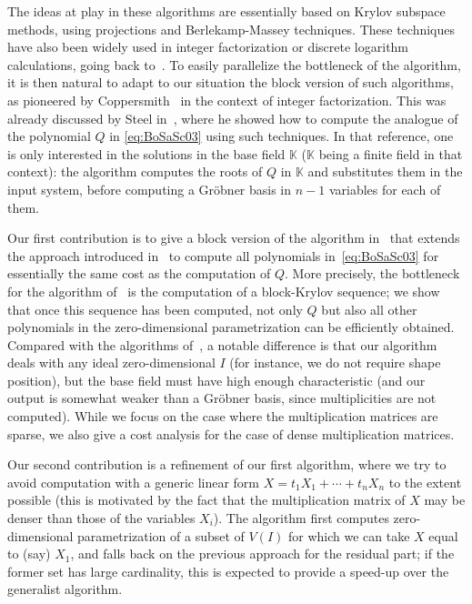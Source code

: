 \documentclass[12pt]{article}
\newcommand{\lf}{X}
\newcommand{\sqfree}{Q}
\def\K{\mathbb{K}}
\def\K {\ensuremath{\mathbb{K}}}
\begin{document}
The ideas at play in these algorithms are essentially based on Krylov
subspace methods, using projections and Berlekamp-Massey techniques.
These techniques have also been widely used in integer factorization
or discrete logarithm calculations, going back to~\cite{LaOd90}.
To easily parallelize the
bottleneck of the algorithm, it is
then natural to adapt to our situation the block version of such
algorithms, as pioneered by Coppersmith~\cite{Coppersmith94}  in the
context of integer factorization. This was already discussed by Steel
in~\cite{Steel15}, where he showed how to compute the analogue of the
polynomial $\sqfree$ in \cref{eq:BoSaSc03} using such techniques. In that reference, one is
only interested in the solutions in the base field $\K$ ($\K$ being a
finite field in that context): the algorithm computes the roots of
$\sqfree$ in $\K$ and substitutes them in the input system, before
computing a Gr\"obner basis in $n-1$ variables for each of them.

Our first contribution is to give a block version of the algorithm
in~\cite{BoSaSc03} that extends the approach introduced
in~\cite{Steel15} to compute all polynomials in~\cref{eq:BoSaSc03} for
essentially the same cost as the computation of $\sqfree$. More
precisely, the bottleneck for the algorithm of~\cite{Steel15} is the
computation of a block-Krylov sequence; we show that once this
sequence has been computed, not only $\sqfree$ but also all other
polynomials in the zero-dimensional parametrization can be efficiently
obtained. Compared with the algorithms of~\cite{FaMo17}, a notable
difference is that our algorithm deals with any ideal zero-dimensional
$I$ (for instance, we do not require shape position), but the
base field must have high enough characteristic (and our output is
somewhat weaker than a Gr\"obner basis, since multiplicities are not
computed). While we focus on the case where the multiplication
matrices are sparse, we also give a cost analysis for the case of
dense multiplication matrices.

Our second contribution is a refinement of our first algorithm, where
we try to avoid computation with a generic linear form $\lf =t_1 X_1 +
\cdots + t_n X_n$ to the extent possible (this is motivated by the
fact that the multiplication matrix of $\lf$ may be denser than those
of the variables $X_i$). The algorithm first computes zero-dimensional
parametrization of a subset of $V(I)$ for which we can take $\lf$
equal to (say) $X_1$, and falls back on the previous approach for the
residual part; if the former set has large cardinality, this is
expected to provide a speed-up over the generalist algorithm.
\end{document}
